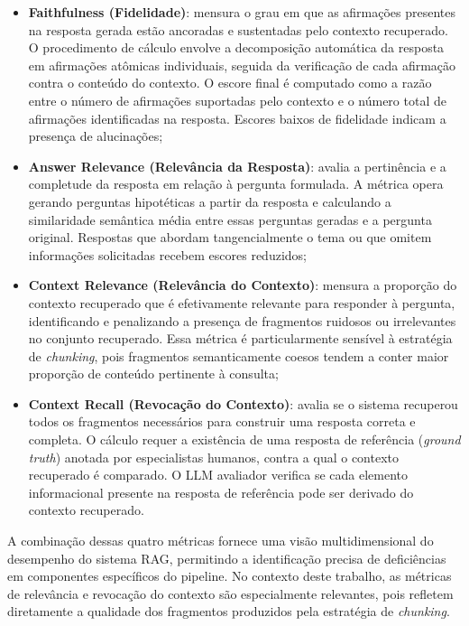 \documentclass[
	12pt,				%
	openright,			%
	oneside,			%
	a4paper,			%
	tccpreliminar,		%
	]{ABNT-DC-UEL}
\begin{document}
\begin{itemize}
    \item \textbf{Faithfulness (Fidelidade)}: mensura o grau em que as afirmações presentes na resposta gerada estão ancoradas e sustentadas pelo contexto recuperado. O procedimento de cálculo envolve a decomposição automática da resposta em afirmações atômicas individuais, seguida da verificação de cada afirmação contra o conteúdo do contexto. O escore final é computado como a razão entre o número de afirmações suportadas pelo contexto e o número total de afirmações identificadas na resposta. Escores baixos de fidelidade indicam a presença de alucinações;
    
    \item \textbf{Answer Relevance (Relevância da Resposta)}: avalia a pertinência e a completude da resposta em relação à pergunta formulada. A métrica opera gerando perguntas hipotéticas a partir da resposta e calculando a similaridade semântica média entre essas perguntas geradas e a pergunta original. Respostas que abordam tangencialmente o tema ou que omitem informações solicitadas recebem escores reduzidos;
    
    \item \textbf{Context Relevance (Relevância do Contexto)}: mensura a proporção do contexto recuperado que é efetivamente relevante para responder à pergunta, identificando e penalizando a presença de fragmentos ruidosos ou irrelevantes no conjunto recuperado. Essa métrica é particularmente sensível à estratégia de \textit{chunking}, pois fragmentos semanticamente coesos tendem a conter maior proporção de conteúdo pertinente à consulta;
    
    \item \textbf{Context Recall (Revocação do Contexto)}: avalia se o sistema recuperou todos os fragmentos necessários para construir uma resposta correta e completa. O cálculo requer a existência de uma resposta de referência (\textit{ground truth}) anotada por especialistas humanos, contra a qual o contexto recuperado é comparado. O LLM avaliador verifica se cada elemento informacional presente na resposta de referência pode ser derivado do contexto recuperado.
\end{itemize}

A combinação dessas quatro métricas fornece uma visão multidimensional do desempenho do sistema RAG, permitindo a identificação precisa de deficiências em componentes específicos do pipeline. No contexto deste trabalho, as métricas de relevância e revocação do contexto são especialmente relevantes, pois refletem diretamente a qualidade dos fragmentos produzidos pela estratégia de \textit{chunking}.
\end{document}
